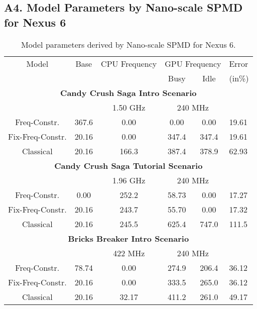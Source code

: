 \subsection*{A4. Model Parameters by Nano-scale SPMD for Nexus 6}
\begin{table*}[tp]
\caption{Model parameters derived by Nano-scale SPMD for Nexus 6.}
\vspace{-0.1in}
{\footnotesize
\begin{tabular}{|c|c|c|c|c|p{5.4mm}|}
    \hline
        Model & Base & \multicolumn{1}{c|}{CPU Frequency} & \multicolumn{2}{c|}{GPU Frequency} & Error \\
     \cline{3-5}
            & & \multicolumn{1}{c|}{} & Busy & Idle & (in\%) \\
    \hline
    \multicolumn{6}{|c|}{\textbf{Candy Crush Saga Intro Scenario}} \\
        \hline
        &  & 1.50 GHz & \multicolumn{2}{c|}{240 MHz} & \\
        \hline
        Freq-Constr. & 367.6 & 0.00 & 0.00 & 0.00 & 19.61 \\
        Fix-Freq-Constr. & 20.16 & 0.00 & 347.4 & 347.4 & 19.61 \\
        \hline
        Classical & 20.16 & 166.3 & 387.4 & 378.9 & 62.93 \\
        \hline

    \multicolumn{6}{|c|}{\textbf{Candy Crush Saga Tutorial Scenario}} \\
        \hline
        &  & 1.96 GHz & \multicolumn{2}{c|}{240 MHz} & \\
        \hline
        Freq-Constr. & 0.00 & 252.2 & 58.73 & 0.00 & 17.27 \\
        Fix-Freq-Constr. & 20.16 & 243.7 & 55.70 & 0.00 & 17.32 \\
        \hline
        Classical & 20.16 & 245.5 & 625.4 & 747.0 & 111.5 \\
        \hline


    \multicolumn{6}{|c|}{\textbf{Bricks Breaker Intro Scenario}} \\
        \hline
        &  & 422 MHz & \multicolumn{2}{c|}{240 MHz} & \\
        \hline
        Freq-Constr. & 78.74 & 0.00 & 274.9 & 206.4 & 36.12 \\
        Fix-Freq-Constr. & 20.16 & 0.00 & 333.5 & 265.0 & 36.12 \\
        \hline
        Classical & 20.16 & 32.17 & 411.2 & 261.0 & 49.17 \\
        \hline


\end{tabular}}
\end{table*}
